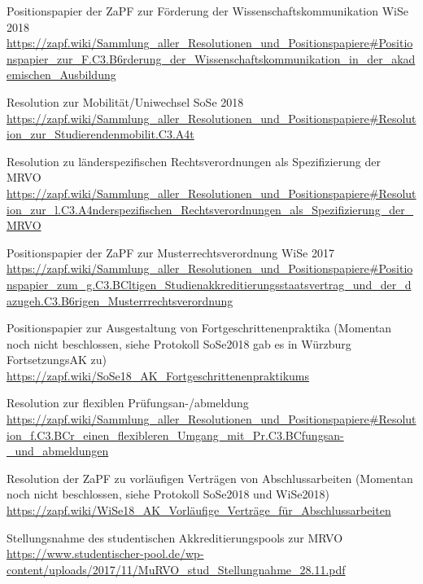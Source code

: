 \documentclass[a4paper]{scrartcl}
\begin{document}
\begin{thebibliography}{999}
 Positionspapier der ZaPF zur Förderung der Wissenschaftskommunikation WiSe 2018\\
\url{https://zapf.wiki/Sammlung_aller_Resolutionen_und_Positionspapiere#Positionspapier_zur_F.C3.B6rderung_der_Wissenschaftskommunikation_in_der_akademischen_Ausbildung}

 Resolution zur Mobilität/Uniwechsel SoSe 2018\\
\url{https://zapf.wiki/Sammlung_aller_Resolutionen_und_Positionspapiere#Resolution_zur_Studierendenmobilit.C3.A4t}

 Resolution zu länderspezifischen Rechtsverordnungen als Spezifizierung der MRVO\\
\url{https://zapf.wiki/Sammlung_aller_Resolutionen_und_Positionspapiere#Resolution_zur_l.C3.A4nderspezifischen_Rechtsverordnungen_als_Spezifizierung_der_MRVO}

 Positionspapier der ZaPF zur Musterrechtsverordnung WiSe 2017\\
\url{https://zapf.wiki/Sammlung_aller_Resolutionen_und_Positionspapiere#Positionspapier_zum_g.C3.BCltigen_Studienakkreditierungsstaatsvertrag_und_der_dazugeh.C3.B6rigen_Musterrrechtsverordnung}

 Positionspapier zur Ausgestaltung von Fortgeschrittenenpraktika (Momentan noch nicht beschlossen, siehe Protokoll SoSe2018 gab es in Würzburg FortsetzungsAK zu)\\
\url{https://zapf.wiki/SoSe18_AK_Fortgeschrittenenpraktikums}

 Resolution zur flexiblen Prüfungsan-/abmeldung \\
\url{https://zapf.wiki/Sammlung_aller_Resolutionen_und_Positionspapiere#Resolution_f.C3.BCr_einen_flexibleren_Umgang_mit_Pr.C3.BCfungsan-_und_abmeldungen}

 Resolution der ZaPF zu vorläufigen Verträgen von Abschlussarbeiten (Momentan noch nicht beschlossen, siehe Protokoll SoSe2018 und WiSe2018)\\
\url{https://zapf.wiki/WiSe18_AK_Vorläufige_Verträge_für_Abschlussarbeiten}


 Stellungsnahme des studentischen Akkreditierungspools zur MRVO \url{https://www.studentischer-pool.de/wp-content/uploads/2017/11/MuRVO_stud_Stellungnahme_28.11.pdf}


\end{thebibliography}
\end{document}
